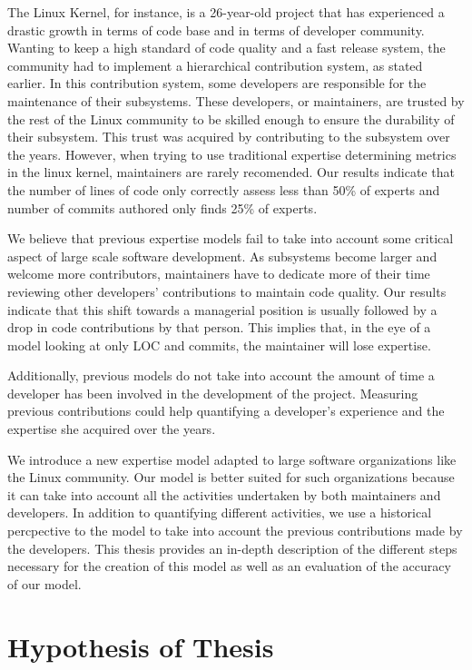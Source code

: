 The Linux Kernel, for instance, is a 26-year-old project that has experienced a drastic growth in terms of code base and in terms of developer community. Wanting to keep a high standard of code quality and a fast release system, the community had to implement a hierarchical contribution system, as stated earlier. In this contribution system, some developers are responsible for the maintenance of their subsystems. These developers, or maintainers, are trusted by the rest of the Linux community to be skilled enough to ensure the durability of their subsystem. This trust was acquired by contributing to the subsystem over the years. However, when trying to use traditional expertise determining metrics in the linux kernel, maintainers are rarely recomended. Our results indicate that the number of lines of code only correctly assess less than 50\% of experts and number of commits authored only finds 25\% of experts. 


We believe that previous expertise models fail to take into account some critical aspect of large scale software development. As subsystems become larger and welcome more contributors, maintainers have to dedicate more of their time reviewing other developers' contributions to maintain code quality. Our results indicate that this shift towards a managerial position is usually followed by a drop in code contributions by that person. This implies that, in the eye of a model looking at only \ac{LOC} and commits, the maintainer will lose expertise. 

Additionally, previous models do not take into account the amount of time a developer has been involved in the development of the project. Measuring previous contributions could help quantifying a developer's experience and the expertise she acquired over the years. 

We introduce a new expertise model adapted to large software organizations like the Linux community. Our model is better suited for such organizations because it can take into account all the activities undertaken by both maintainers and developers. In addition to quantifying different activities, we use a historical percpective to the model to take into account the previous contributions made by the developers. This thesis provides an in-depth description of the different steps necessary for the creation of this model as well as an evaluation of the accuracy of our model. 



\section{Hypothesis of Thesis}

